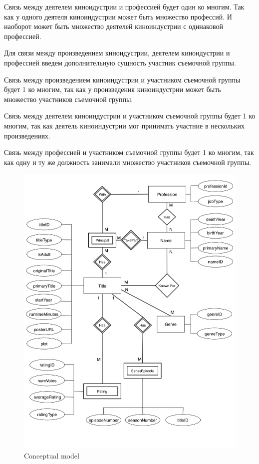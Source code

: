 \documentclass[12pt,a4paper]{article}
\begin{document}
Связь между деятелем киноидустрии и профессией будет один ко многим. Так как у одного деятеля киноиндустрии может быть множество профессий. 
И наоборот может быть множество деятелей киноиндустрии с одинаковой профессией. \par
Для связи между произведением киноидустрии, деятелем киноидустрии и профессией введем дополнительную сущность участник съемочной группы. \par
Связь между произведением киноиндустрии и участником съемочной группы будет 1 ко многим, 
так как у произведения киноиндустрии может быть множество участников съемочной группы. \par
Связь между деятелем киноиндустрии и участником съемочной группы будет 1 ко многим, 
так как деятель киноиндустрии мог принимать участние в нескольких произведениях. \par
Связь между профессией и участником съемочной группы будет 1 ко многим, 
так как одну и ту же должность занимали множество участников съемочной группы. \par
\begin{figure}[ht]
    \centering
    \includegraphics[width=\linewidth]{images/Lab1/conceptual_model.jpg}
    \caption{Conceptual model}
    \label{fig:Conceptual model}
\end{figure}
\end{document}
